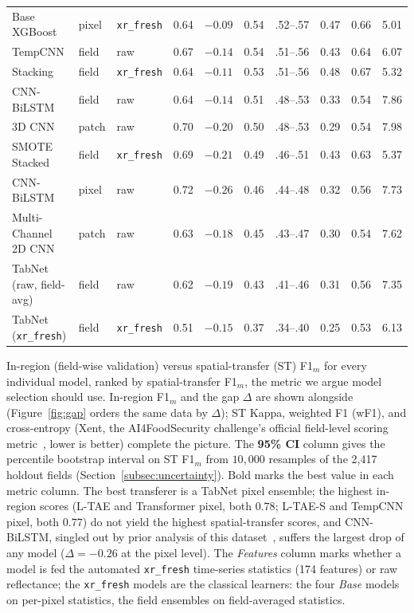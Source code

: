 \documentclass[pdflatex,sn-mathphys]{sn-jnl} %
\begin{document}
\begin{table}[htbp]
\begin{tabular}{lllccccccc}
Base XGBoost          & pixel & \texttt{xr\_fresh} & 0.64 & $-0.09$ & 0.54 & .52--.57 & 0.47 & 0.66 & 5.01 \\
TempCNN               & field & raw & 0.67 & $-0.14$ & 0.54 & .51--.56 & 0.43 & 0.64 & 6.07 \\
Stacking              & field & \texttt{xr\_fresh} & 0.64 & $-0.11$ & 0.53 & .51--.56 & 0.48 & 0.67 & 5.32 \\
CNN-BiLSTM            & field & raw & 0.64 & $-0.14$ & 0.51 & .48--.53 & 0.33 & 0.54 & 7.86 \\
3D CNN                & patch & raw & 0.70 & $-0.20$ & 0.50 & .48--.53 & 0.29 & 0.54 & 7.98 \\
SMOTE Stacked         & field & \texttt{xr\_fresh} & 0.69 & $-0.21$ & 0.49 & .46--.51 & 0.43 & 0.63 & 5.37 \\
CNN-BiLSTM            & pixel & raw & 0.72 & $-0.26$ & 0.46 & .44--.48 & 0.32 & 0.56 & 7.73 \\
Multi-Channel 2D CNN  & patch & raw & 0.63 & $-0.18$ & 0.45 & .43--.47 & 0.30 & 0.54 & 7.62 \\
TabNet (raw, field-avg) & field & raw & 0.62 & $-0.19$ & 0.43 & .41--.46 & 0.31 & 0.56 & 7.35 \\
TabNet (\texttt{xr\_fresh}) & field & \texttt{xr\_fresh} & 0.51 & $-0.15$ & 0.37 & .34--.40 & 0.25 & 0.53 & 6.13 \\
\bottomrule
\end{tabular}

\par\vspace{4pt}
{\footnotesize In-region (field-wise validation) versus spatial-transfer (ST) F1$_m$
for every individual model, ranked by spatial-transfer F1$_m$, the metric we argue
model selection should use. In-region F1$_m$ and the gap $\Delta$ are shown
alongside (Figure~\ref{fig:gap} orders the same data by $\Delta$); ST Kappa, weighted
F1 (wF1), and cross-entropy (Xent, the AI4FoodSecurity challenge's official field-level scoring metric~\cite{ai4foodsecurity}, lower is better) complete the picture. The
\textbf{95\% CI} column gives the percentile bootstrap interval on ST F1$_m$ from
$10{,}000$ resamples of the 2{,}417 holdout fields (Section~\ref{subsec:uncertainty}).
Bold marks the best value in each metric column. The best transferer is a TabNet pixel ensemble; the highest in-region
scores (L-TAE and Transformer pixel, both $0.78$; L-TAE-S and TempCNN pixel, both $0.77$)
do not yield the highest spatial-transfer scores, and CNN-BiLSTM, singled out by prior
analysis of this dataset~\cite{capstone_repo}, suffers the largest drop of any model
($\Delta = -0.26$ at the pixel level). The \emph{Features} column
marks whether a model is fed the automated \texttt{xr\_fresh} time-series statistics
(174 features) or raw reflectance; the \texttt{xr\_fresh} models are the classical
learners: the four \emph{Base} models on per-pixel statistics, the field ensembles on
field-averaged statistics.\par}
\end{table}
\end{document}

